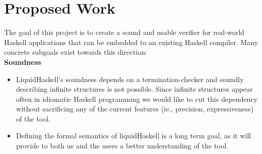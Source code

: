 \section*{Proposed Work}

The goal of this project is to create a sound and usable verifier
for real-world Haskell applications that can be embedded to an
existing Haskell compiler.
%
Many concrete subgoals exist towards this direction: \\

\textbf{Soundness}
\begin{itemize}
\item
LiquidHaskell's soundness
depends on a termination-checker and
soundly describing infinite structures is not possible.
%
Since infinite structures appear often in 
idiomatic Haskell programming
we would like to cut this dependency
without sacrificing any of the current 
features (ie., precision, expressiveness) of the tool.



\item 
Defining the formal semantics of liquidHaskell
is a long term goal, 
as it will provide to both us and the users 
a better understanding of the tool.
\end{itemize}


